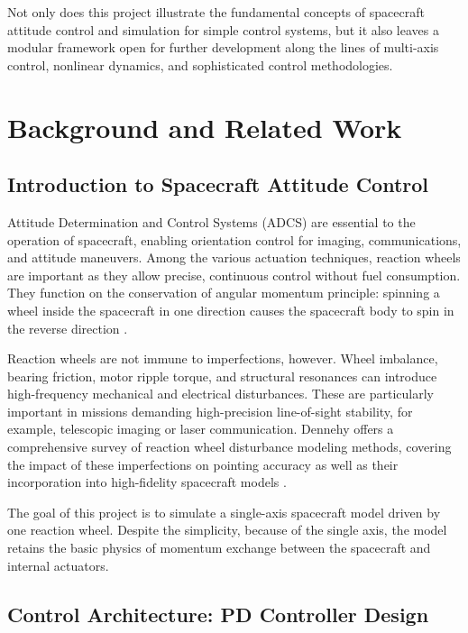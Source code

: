 \documentclass{ifacconf}
\begin{document}
Not only does this project illustrate the fundamental concepts of spacecraft attitude control and simulation for simple control systems, but it also leaves a modular framework open for further development along the lines of multi-axis control, nonlinear dynamics, and sophisticated control methodologies.



\section{Background and Related Work}

\subsection{Introduction to Spacecraft Attitude Control}

Attitude Determination and Control Systems (ADCS) are essential to the operation of spacecraft, enabling orientation control for imaging, communications, and attitude maneuvers. Among the various actuation techniques, reaction wheels are important as they allow precise, continuous control without fuel consumption. They function on the conservation of angular momentum principle: spinning a wheel inside the spacecraft in one direction causes the spacecraft body to spin in the reverse direction \citep{Wertz1978}.

Reaction wheels are not immune to imperfections, however. Wheel imbalance, bearing friction, motor ripple torque, and structural resonances can introduce high-frequency mechanical and electrical disturbances. These are particularly important in missions demanding high-precision line-of-sight stability, for example, telescopic imaging or laser communication. Dennehy offers a comprehensive survey of reaction wheel disturbance modeling methods, covering the impact of these imperfections on pointing accuracy as well as their incorporation into high-fidelity spacecraft models \citep{Dennehy2004}.

The goal of this project is to simulate a single-axis spacecraft model driven by one reaction wheel.  Despite the simplicity, because of the single axis, the model retains the basic physics of momentum exchange between the spacecraft and internal actuators.

\subsection{Control Architecture: PD Controller Design}
\end{document}
